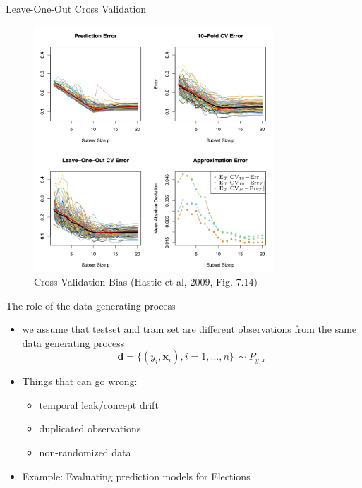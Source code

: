 \documentclass[10pt,handout]{beamer}
\begin{document}
\begin{frame}{Leave-One-Out Cross Validation}

\begin{figure}[h]
\caption{Cross-Validation Bias (Hastie et al, 2009, Fig. 7.14)}
\centering
\includegraphics[width=0.8\textwidth]{figs/ESL_7_14.png}
\end{figure}

\end{frame}









\begin{frame}{The role of the data generating process}

\begin{itemize}
\item we assume that testset and train set are different observations from the same data generating process
\[
\mathbf{d} = \{(y_i, \mathbf{x}_i), i = 1, ..., n\} \,\sim P_{y,x}
\]
\item Things that can go wrong:
\begin{itemize}
\item temporal leak/concept drift
\item duplicated observations
\item non-randomized data
\end{itemize}
\pause
\item Example: Evaluating prediction models for Elections
\end{itemize}


\end{frame}
\end{document}
